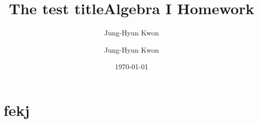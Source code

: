 \documentclass[11pt,letterpaper]{article}
\author{Jung-Hyun Kwon}
\title{The test title}
\begin{document}
\title{Algebra I Homework}
\author{Jung-Hyun Kwon}
\date{\today}
\maketitle
\section{fekj}
\end{document}

